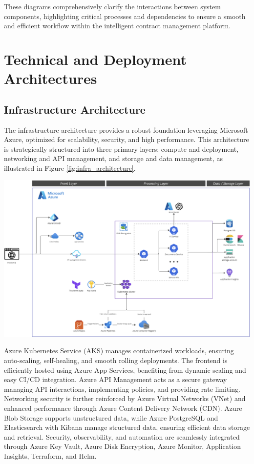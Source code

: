 These diagrams comprehensively clarify the interactions between system components, highlighting critical processes and dependencies to ensure a smooth and efficient workflow within the intelligent contract management platform.

\section{Technical and Deployment Architectures}

\subsection{Infrastructure Architecture}
The infrastructure architecture provides a robust foundation leveraging Microsoft Azure, optimized for scalability, security, and high performance. This architecture is strategically structured into three primary layers: compute and deployment, networking and API management, and storage and data management, as illustrated in Figure \ref{fig:infra_architecture}.

\begin{center}
    \centering
    \includegraphics[width=1\textwidth]{Images/Infra Architecture.png}
    \label{fig:infra_architecture}
\end{center}

Azure Kubernetes Service (AKS) manages containerized workloads, ensuring auto-scaling, self-healing, and smooth rolling deployments. The frontend is efficiently hosted using Azure App Services, benefiting from dynamic scaling and easy CI/CD integration. Azure API Management acts as a secure gateway managing API interactions, implementing policies, and providing rate limiting. Networking security is further reinforced by Azure Virtual Networks (VNet) and enhanced performance through Azure Content Delivery Network (CDN). Azure Blob Storage supports unstructured data, while Azure PostgreSQL and Elasticsearch with Kibana manage structured data, ensuring efficient data storage and retrieval. Security, observability, and automation are seamlessly integrated through Azure Key Vault, Azure Disk Encryption, Azure Monitor, Application Insights, Terraform, and Helm.

